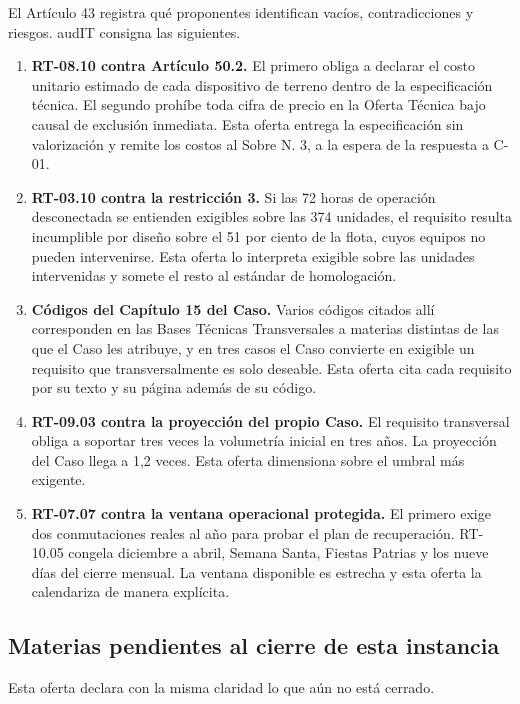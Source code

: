El Artículo 43 registra qué proponentes identifican vacíos, contradicciones y riesgos. audIT
consigna las siguientes.

\begin{enumerate}
    \item \textbf{RT-08.10 contra Artículo 50.2.} El primero obliga a declarar el costo unitario
    estimado de cada dispositivo de terreno dentro de la especificación técnica. El segundo prohíbe
    toda cifra de precio en la Oferta Técnica bajo causal de exclusión inmediata. Esta oferta
    entrega la especificación sin valorización y remite los costos al Sobre N.\textordmasculine{}
    3, a la espera de la respuesta a C-01.
    \item \textbf{RT-03.10 contra la restricción 3.} Si las 72 horas de operación desconectada se
    entienden exigibles sobre las 374 unidades, el requisito resulta incumplible por diseño sobre
    el 51 por ciento de la flota, cuyos equipos no pueden intervenirse. Esta oferta lo interpreta
    exigible sobre las unidades intervenidas y somete el resto al estándar de homologación.
    \item \textbf{Códigos del Capítulo 15 del Caso.} Varios códigos citados allí corresponden en
    las Bases Técnicas Transversales a materias distintas de las que el Caso les atribuye, y en
    tres casos el Caso convierte en exigible un requisito que transversalmente es solo deseable.
    Esta oferta cita cada requisito por su texto y su página además de su código.
    \item \textbf{RT-09.03 contra la proyección del propio Caso.} El requisito transversal obliga a
    soportar tres veces la volumetría inicial en tres años. La proyección del Caso llega a 1,2
    veces. Esta oferta dimensiona sobre el umbral más exigente.
    \item \textbf{RT-07.07 contra la ventana operacional protegida.} El primero exige dos
    conmutaciones reales al año para probar el plan de recuperación. RT-10.05 congela diciembre a
    abril, Semana Santa, Fiestas Patrias y los nueve días del cierre mensual. La ventana disponible
    es estrecha y esta oferta la calendariza de manera explícita.
\end{enumerate}


\subsection{Materias pendientes al cierre de esta instancia}

Esta oferta declara con la misma claridad lo que aún no está cerrado.

